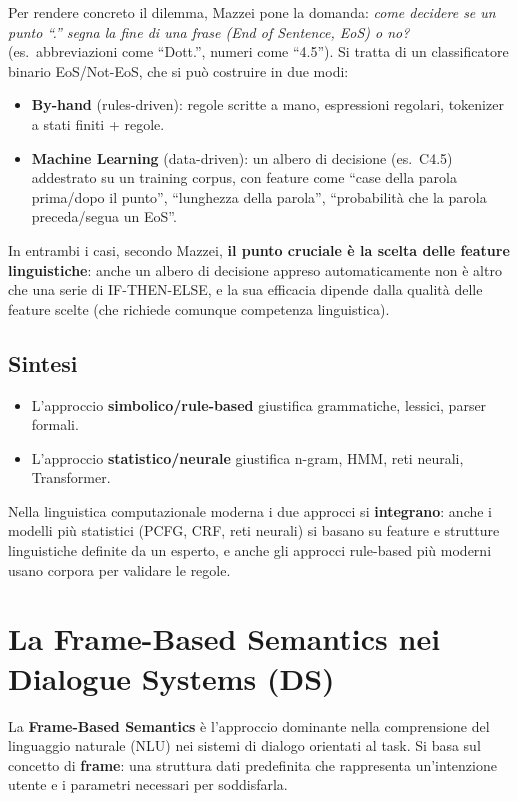 \documentclass[12pt,a4paper]{article}
\begin{document}
Per rendere concreto il dilemma, Mazzei pone la domanda: \emph{come decidere se un punto ``.''  segna la fine di una frase (End of Sentence, EoS) o no?} (es.\ abbreviazioni come ``Dott.'', numeri come ``4.5''). Si tratta di un classificatore binario EoS/Not-EoS, che si può costruire in due modi:
\begin{itemize}[leftmargin=1.5em]
  \item \textbf{By-hand} (rules-driven): regole scritte a mano, espressioni regolari, tokenizer a stati finiti + regole.
  \item \textbf{Machine Learning} (data-driven): un albero di decisione (es.\ C4.5) addestrato su un training corpus, con feature come ``case della parola prima/dopo il punto'', ``lunghezza della parola'', ``probabilità che la parola preceda/segua un EoS''.
\end{itemize}
In entrambi i casi, secondo Mazzei, \textbf{il punto cruciale è la scelta delle feature linguistiche}: anche un albero di decisione appreso automaticamente non è altro che una serie di IF-THEN-ELSE, e la sua efficacia dipende dalla qualità delle feature scelte (che richiede comunque competenza linguistica).

\subsection{Sintesi}
\begin{itemize}[leftmargin=1.5em]
  \item L'approccio \textbf{simbolico/rule-based} giustifica grammatiche, lessici, parser formali.
  \item L'approccio \textbf{statistico/neurale} giustifica n-gram, HMM, reti neurali, Transformer.
\end{itemize}
Nella linguistica computazionale moderna i due approcci si \textbf{integrano}: anche i modelli più statistici (PCFG, CRF, reti neurali) si basano su feature e strutture linguistiche definite da un esperto, e anche gli approcci rule-based più moderni usano corpora per validare le regole.

\section{La Frame-Based Semantics nei Dialogue Systems (DS)}

La \textbf{Frame-Based Semantics} è l'approccio dominante nella comprensione del linguaggio naturale (NLU) nei sistemi di dialogo orientati al task. Si basa sul concetto di \textbf{frame}: una struttura dati predefinita che rappresenta un'intenzione utente e i parametri necessari per soddisfarla.
\end{document}
